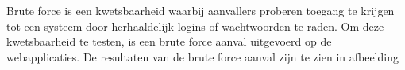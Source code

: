 Brute force is een kwetsbaarheid waarbij aanvallers proberen toegang te krijgen tot een systeem door herhaaldelijk logins of 
wachtwoorden te raden. Om deze kwetsbaarheid te testen, is een brute force aanval uitgevoerd op de webapplicaties. De 
resultaten van de brute force aanval zijn te zien in afbeelding 